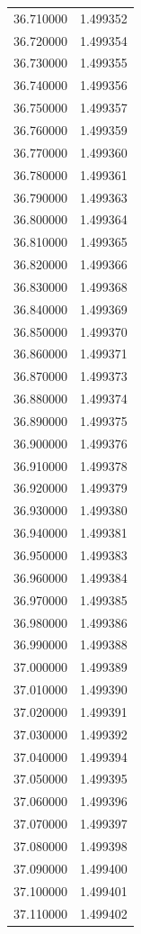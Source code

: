 \begin{tabular}{rr}
36.710000 & 1.499352 \\
36.720000 & 1.499354 \\
36.730000 & 1.499355 \\
36.740000 & 1.499356 \\
36.750000 & 1.499357 \\
36.760000 & 1.499359 \\
36.770000 & 1.499360 \\
36.780000 & 1.499361 \\
36.790000 & 1.499363 \\
36.800000 & 1.499364 \\
36.810000 & 1.499365 \\
36.820000 & 1.499366 \\
36.830000 & 1.499368 \\
36.840000 & 1.499369 \\
36.850000 & 1.499370 \\
36.860000 & 1.499371 \\
36.870000 & 1.499373 \\
36.880000 & 1.499374 \\
36.890000 & 1.499375 \\
36.900000 & 1.499376 \\
36.910000 & 1.499378 \\
36.920000 & 1.499379 \\
36.930000 & 1.499380 \\
36.940000 & 1.499381 \\
36.950000 & 1.499383 \\
36.960000 & 1.499384 \\
36.970000 & 1.499385 \\
36.980000 & 1.499386 \\
36.990000 & 1.499388 \\
37.000000 & 1.499389 \\
37.010000 & 1.499390 \\
37.020000 & 1.499391 \\
37.030000 & 1.499392 \\
37.040000 & 1.499394 \\
37.050000 & 1.499395 \\
37.060000 & 1.499396 \\
37.070000 & 1.499397 \\
37.080000 & 1.499398 \\
37.090000 & 1.499400 \\
37.100000 & 1.499401 \\
37.110000 & 1.499402 \\

\end{tabular}
